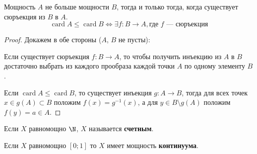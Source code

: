 \documentclass{article}
\DeclareMathOperator{\card}{card}
\begin{document}
\begin{proposition}
    \label{prop:set-cardinality-order}
    Мощность \(A\) не больше мощности \(B\), тогда и только тогда, когда существует сюръекция из \(B\) в \(A\).  
    \[\card A \leqslant \card B \Leftrightarrow \exists f: B \rightarrow A, \text{где \(f\) --- сюръекция}\]
\end{proposition}
\begin{proof} 
    Докажем в обе стороны (\(A\), \(B\) не пусты): 

    \fbox{\(\Leftarrow\)} Если существует сюръекция \(f: B \rightarrow A\), то чтобы получить инъекцию из \(A\) в \(B\) достаточно выбрать из каждого прообраза каждой точки \(A\) по одному элементу \(B\).   
    
    \fbox{\(\Rightarrow\)} Если \(\card A \leqslant \card B\), то существует инъекция \(g: A \rightarrow B\), тогда для всех точек \(x \in g(A) \subset B\) положим \(f(x) = g^{-1}(x)\), а для \(y \in B \setminus g(A)\) положим \(f(y) = a \in A\).  
\end{proof}

\begin{definition}
    \label{def:countable-set}
    Если \(X\) равномощно \(\N\), \(X\) называется \textbf{счетным}.
\end{definition}

\begin{definition}
    \label{def:continuum}
    Если \(X\) равномощно \([0; 1]\) то \(X\) имеет мощность \textbf{континуума}. 
\end{definition}
\end{document}
